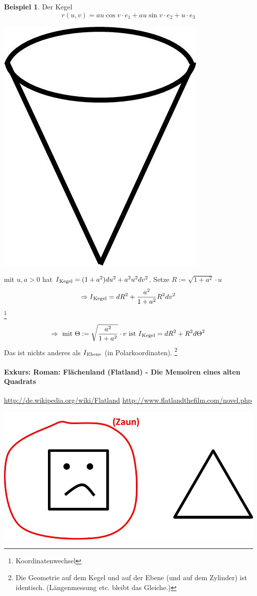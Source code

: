 \documentclass[a4paper,11pt,notitlepage]{report}
\theoremstyle{definition}
\newtheorem{example}{Beispiel}[chapter]
\newcommand{\RM}[1]{\MakeUppercase{\romannumeral #1{}}}
\begin{document}
\begin{example}
	Der Kegel
	$$r(u,v) = a u \cos v \cdot e_1 + a u \sin v \cdot e_2 + u \cdot e_3$$
		\begin{center}
		\includegraphics[scale=0.4]{images/2012_01_24_Bild7.jpg}
	\end{center}
	mit $u,a > 0$ hat $\RM{1}_{\text{Kegel}} = (1 + a^2) du^2 + a^2 u^2 dv^2$.
	Setze $R:= \sqrt{1+a^2} \cdot u$
	$$\Rightarrow \RM{1}_{\text{Kegel}} = dR^2 + \frac{a^2}{1+a^2} R^2 dv^2$$ \footnote{Koordinatenwechsel}
	$$\Rightarrow \text{ mit } \Theta := \sqrt{\frac{a^2}{1+a^2}} \cdot v \text{ ist } \RM{1}_{\text{Kegel}} = d R^2 + R^2 d \Theta^2$$
	Das ist nichts anderes als $\RM{1}_{\text{Ebene}}$ (in Polarkoordinaten). \footnote{Die Geometrie auf dem Kegel und auf der Ebene (und auf dem Zylinder) ist identisch. (Längenmessung etc. bleibt das Gleiche.)}
\end{example}

\paragraph{Exkurs: Roman: Flächenland (Flatland) - Die Memoiren eines alten Quadrats}
	\url{http://de.wikipedia.org/wiki/Flatland}
	\url{http://www.flatlandthefilm.com/novel.php}
	\begin{center}
		\includegraphics[scale=0.4]{images/2012_01_26_Bild1.jpg}
	\end{center}
	
\end{document}

